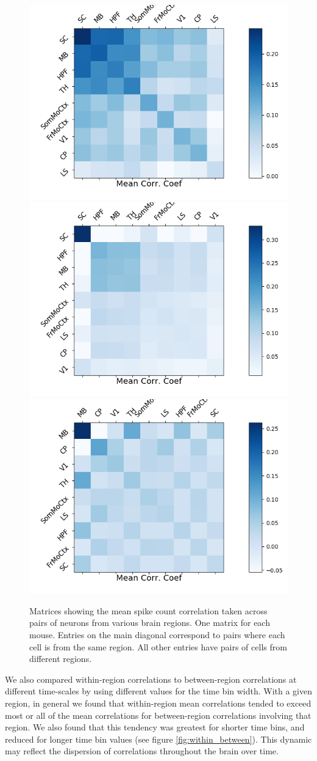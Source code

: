 \documentclass[a4paper,12pt]{article}
\theoremstyle{definition}
\begin{document}
\begin{figure}[t!]
    \centering
    \includegraphics[width=0.32\columnwidth]{images/Krebs_2p0_corr.png}
    \includegraphics[width=0.32\columnwidth]{images/Robbins_2p0_corr.png}
    \includegraphics[width=0.32\columnwidth]{images/Waksman_2p0_corr.png}
    \caption{Matrices showing the mean spike count correlation taken across pairs of neurons from various brain regions. One matrix for each mouse. Entries on the main diagonal correspond to pairs where each cell is from the same region. All other entries have pairs of cells from different regions.}
    \label{fig:regional_correlation_matrices}
\end{figure}

We also compared within-region correlations to between-region correlations at different time-scales by using different values for the time bin width. With a given region, in general we found that within-region mean correlations tended to exceed most or all of the mean correlations for between-region correlations involving that region. We also found that this tendency was greatest for shorter time bins, and reduced for longer time bin values (see figure \ref{fig:within_between}). This dynamic may reflect the dispersion of correlations throughout the brain over time.
\end{document}
